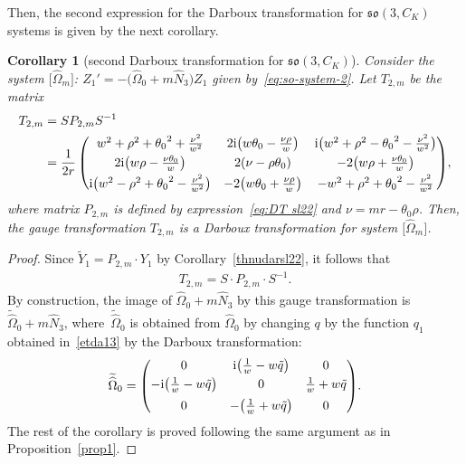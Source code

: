 \documentclass[10pt,a4paper]{amsart}
\numberwithin{equation}{section}
\newtheorem{Corollary}[Theorem]{Corollary}
\begin{document}
 Then, the second expression for the Darboux transformation for $\mathfrak{so}(3, C_K)$ systems is given by the next corollary.

\begin{Corollary}[second Darboux transformation for $\mathfrak{so}(3, C_K)$]\label{secthdars032}
Consider the system $\big[\widehat{\Omega}_m\big]$\emph{:} $Z_1' = - \big(\widehat{\Omega}_0 + m \widehat{N}_3 \big) Z_1$ given by~\eqref{eq:so-system-2}. Let $T_{2,m}$ be the matrix
\begin{align*}
 T_{2,m} &= S P_{2,m} S^{-1} \nonumber
 \\
 &= \dfrac{1}{2r} \begin{pmatrix} {w}^{2}+{\rho}^{2}+{\theta_0 }^{2}+{\frac {{\nu}^{2}}{{w}^{2}}} & 2{\rm i} \big (w \theta_0 -{\frac {\nu \rho}{w}} \big )
& {\rm i} \big ( {w}^{2}+ {\rho}^{2}- {\theta_0 }^{2}-{\frac {{\nu}^{2}}{{w}^{2}}} \big )
\\[1mm]
2 {\rm i} \big ( w \rho-{\frac {\nu \theta_0 }{w}} \big ) & 2 ( \nu - \rho \theta_0 ) & -2 \big ( w \rho + {\frac { \nu \theta_0 }{w}} \big )
\\[1mm]
{\rm i} \big ( {w}^{2}- {\rho}^{2}+ {\theta_0 }^{2}-{\frac {{\nu}^{2}}{{w}^{2}}} \big ) & -2 \big( w \theta_0 + {\frac {\nu \rho}{w}} \big ) & -{
w}^{2}+{\rho}^{2}+{\theta_0 }^{2}-{\frac {{\nu}^{2}}{{w}^{2}}}
\end{pmatrix}\!,
\end{align*}
where matrix $P_{2,m}$ is defined by expression~\eqref{eq:DT sl22} and $\nu=mr-\theta_0 \rho$. Then, the gauge transformation $T_{2,m}$ is a Darboux transformation for system $\big[\widehat{\Omega}_m\big]$.
\end{Corollary}

\begin{proof}
Since $ \widetilde{Y}_1 =P_{2,m} \cdot Y_1$ by Corollary~\ref{thnudarsl22},
it follows that
\begin{gather*}
T_{2,m} = S \cdot P_{2,m} \cdot S^{-1}.
\end{gather*}
By construction, the image of $\widehat{\Omega}_0 + m \widehat{N}_3$ by this gauge transformation is
$\widetilde{\widehat{\Omega}}_0 + m \widehat{N}_3$, where~$\widetilde{\widehat{\Omega}}_0$ is obtained from $\widehat{\Omega}_0$ by changing $q$ by the function $q_{1}$ obtained in~\eqref{etda13} by the Darboux transformation:
\begin{gather*}
\widetilde{\widehat{\Omega}}_0 = \begin{pmatrix}
 0 & {\rm i} \big (\frac{1}{w} - w\tilde{q} \big) & 0
 \vspace{1mm}\\
 -{\rm i} \big (\frac{1}{w} - w\tilde{q} \big) & 0 & \frac{1}{w} + w\tilde{q} \\[5pt] 0 & - \big ( \frac{1}{w} + w\tilde{q} \big ) & 0 \end{pmatrix}\!.
 \end{gather*}
The rest of the corollary is proved following the same argument as in Proposition~\ref{prop1}.
\end{proof}
\end{document}
